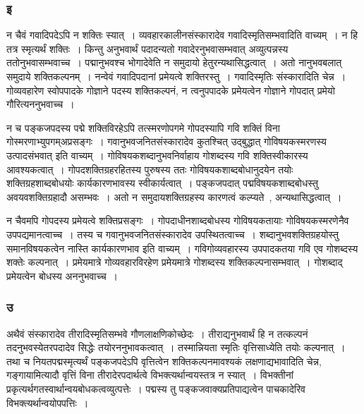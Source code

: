 			\subsubsection{इ}

				\begin{small}

					न चैवं गवादिपदेऽपि न शक्तिः स्यात्~। व्यवहारकालीनसंस्कारादेव गवादिस्मृतिसम्भवादिति वाच्यम्~। न हि तत्र स्मृत्यर्थं शक्तिः~। किन्तु अनुभवार्थं पदादन्यतो गवादेरनुभवासम्भवात् अव्युत्पन्नस्य ततोनुभवासम्भवाच्च~। पद्मानुभवश्च भोगादेवेति न समुदायो हेतुरन्यथासिद्धत्वात्~। अतो नानुभवबलात् समुदाये शक्तिकल्पनम्~। नन्वेवं गवादिपदानां प्रमेयत्वे शक्तिरस्तु~। गवादिस्मृतिः संस्कारादिति चेन्न~। गोव्यवहारेण स्वोपपादके गोज्ञाने पदस्य शक्तिकल्पनं, न त्वनुपपादके प्रमेयत्वेन गोज्ञाने गोपदात् प्रमेयो गौरित्यननुभवाच्च~। 
				\end{small}
					
				न च पङ्कजपदस्य पद्मे शक्तिविरहेऽपि तत्स्मरणोपगमे गोपदस्यापि गवि शक्तिं विना गोस्मरणाभ्युपगम्अप्रसङ्गः~। गवानुभवजनितसंस्कारादेव कुतश्चित् उद्बुद्धात् गोविषयकस्मरणस्य उत्पादसंभवात् इति वाच्यम्~। गोविषयकशब्दानुभवनिर्वाहाय गोशब्दस्य गवि शक्तिस्वीकारस्य आवश्यकत्वात्~।  गोपदशक्तिग्रहरहितस्य पुरुषस्य ततः गोविषयकशाब्दबोधानुदयेन तयोः शक्तिग्रहशाब्दबोधयोः कार्यकारणभावस्य स्वीकार्यत्वात्~। पङ्कजपदात् पद्मविषयकशाब्दबोधस्तु  अवयवशक्तिग्रहादौ असम्भवः~।  अतो न समुदायशक्तिग्रहस्य कारणत्वं कल्प्यते~, अन्यथासिद्धत्वात्~। 
	
				न चैवमपि गोपदस्य प्रमेयत्वे शक्तिप्रसङ्गः~।  गोपदाधीनशाब्दबोधस्य गोविषयकतायाः गोविषयकस्मरणेनैव उपपद्यमानत्वाच्च~।  तस्य च गवानुभवजनितसंस्कारादेव उपस्थितत्वाच्च~।  शब्दानुभवशक्तिग्रहयोस्तु समानविषयकत्वेन नास्ति कार्यकारणभाव इति वाच्यम्~। गविगोव्यवहारस्य उपपादकतया गवि एव गोशब्दस्य शक्तेः कल्पनात्~।  प्रमेयमात्रे गोव्यवहारविरहेण प्रमेयमात्रे गोशब्दस्य  शक्तिकल्पनासम्भवात्~।  गोशब्दाद् प्रमेयत्वेन बोधस्य अननुभवाच्च~। 
	
			\subsubsection{उ}
	
				\begin{small}
				
					अथैवं संस्कारादेव तीरादिस्मृतिसम्भवे गौणलाक्षणिकोच्छेदः~। तीराद्यनुभवार्थं हि न तत्कल्पनं तदनुभवस्येतरपदादेव सिद्धेः तयोरननुभावकत्वात्~। तस्मान्नियता स्मृतिः वृत्तिसाध्येति तयोः कल्पनात्~। तथा च नियतपद्मस्मृत्यर्थं पङ्कजपदेऽपि वृत्तित्वेन शक्तिकल्पनमावश्यकं लक्षणाद्यभावादिति चेन्न, गङ्गायामित्यादौ वृत्तिं विना तीरादेरपदार्थत्वे विभक्त्यर्थान्वयस्तत्र न स्यात्~। विभक्तीनां प्रकृत्यर्थगतस्वार्थान्वयबोधकत्वव्युत्पत्तेः~। पद्मस्य तु पङ्कजवाक्यप्रतिपाद्यत्वेन पाचकादेरिव विभक्त्यर्थान्वयोपपत्तिः~।
				\end{small}
			
